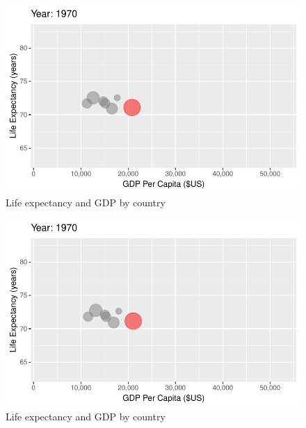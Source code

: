 \documentclass[
  letterpaper,
  DIV=11,
  numbers=noendperiod]{scrreport}
\theoremstyle{definition}
\theoremstyle{remark}
\begin{document}
\begin{figure}

{\centering \includegraphics{index_files/figure-pdf/fig-anim-country-33.pdf}

}

\caption{\label{fig-anim-country-33}Life expectancy and GDP by country}

\end{figure}

\begin{figure}

{\centering \includegraphics{index_files/figure-pdf/fig-anim-country-34.pdf}

}

\caption{\label{fig-anim-country-34}Life expectancy and GDP by country}

\end{figure}
\end{document}
